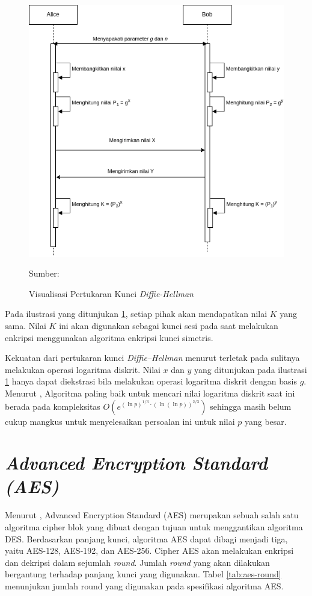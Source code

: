 \begin{figure}[!h]
  \centering
  \includegraphics[width=\textwidth]{chapters/res/chapter-2/img/crypto.dh.png}
  \caption{Visualisasi Pertukaran Kunci \emph{Diffie-Hellman}} \label{fig:crypto.dh}
  Sumber: \textcite{munir2019}
\end{figure}

Pada ilustrasi yang ditunjukan \ref{fig:crypto.dh}, setiap pihak akan mendapatkan nilai $K$ yang sama. Nilai $K$ ini akan digunakan sebagai kunci sesi pada saat melakukan enkripsi menggunakan algoritma enkripsi kunci simetris.

Kekuatan dari pertukaran kunci \emph{Diffie–Hellman} menurut \textcite{munir2019} terletak pada sulitnya melakukan operasi logaritma diskrit. Nilai $x$ dan $y$ yang ditunjukan pada ilustrasi \ref{fig:crypto.dh} hanya dapat diekstrasi bila melakukan operasi logaritma diskrit dengan basis $g$. Menurut \textcite{staling2011}, Algoritma paling baik untuk mencari nilai logaritma diskrit saat ini berada pada kompleksitas $O(e^{(\ln{p})^{1/3} \cdot (\ln{(\ln{p})})^{2/3}})$ sehingga masih belum cukup mangkus untuk menyelesaikan persoalan ini untuk nilai $p$ yang besar.

\section{\emph{Advanced Encryption Standard (AES)}}
Menurut \textcite{staling2011}, Advanced Encryption Standard (AES) merupakan sebuah salah satu algoritma cipher blok yang dibuat dengan tujuan untuk menggantikan algoritma DES. Berdasarkan panjang kunci, algoritma AES dapat dibagi menjadi tiga, yaitu AES-128, AES-192, dan AES-256. Cipher AES akan melakukan enkripsi dan dekripsi dalam sejumlah \emph{round}. Jumlah \emph{round} yang akan dilakukan bergantung terhadap panjang kunci yang digunakan. Tabel \ref{tab:aes-round} menunjukan jumlah round yang digunakan pada spesifikasi algoritma AES.

